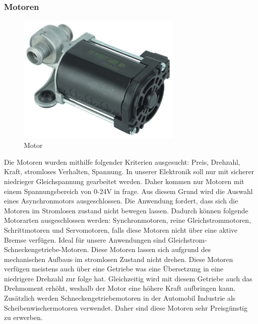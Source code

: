 \subsubsection{Motoren}
\begin{figure}[H] 
\begin{center}

\includegraphics[width=8cm]{Bilder/Bauteile/Motor}
\caption{Motor}
\label{Motor}

\end{center}
\end{figure}
Die Motoren wurden mithilfe folgender Kriterien ausgesucht: Preis, Drehzahl, Kraft, stromloses Verhalten, Spannung.
In unserer Elektronik soll nur mit sicherer niedrieger Gleichspannung gearbeitet werden. Daher kommen nur Motoren mit einem Spannungsbereich von 0-24V in frage. Aus diesem Grund wird die Auswahl eines Asynchronmotors ausgeschlossen. Die Anwendung fordert, dass sich die Motoren im Stromlosen zustand nicht bewegen lassen. Dadurch können folgende Motorarten ausgeschlossen werden: Synchronmotoren, reine Gleichstrommotoren, Schrittmotoren und Servomotoren, falls diese Motoren nicht über eine aktive Bremse verfügen. Ideal für unsere Anwendungen sind Gleichstrom-Schneckengetriebe-Motoren. Diese Motoren lassen sich aufgrund des mechanischen Aufbaus im stromlosen Zustand nicht drehen. Diese Motoren verfügen meistens auch über eine Getriebe was eine Übersetzung in eine niedrigere Drehzahl zur folge hat. Gleichzeitig wird mit diesem Getriebe auch das Drehmoment erhöht, weshalb der Motor eine höhere Kraft aufbringen kann. Zusätzlich werden Schneckengetriebemotoren in der Automobil Industrie als Scheibenwischermotoren verwendet. Daher sind diese Motoren sehr Preisgünstig zu erwerben.

